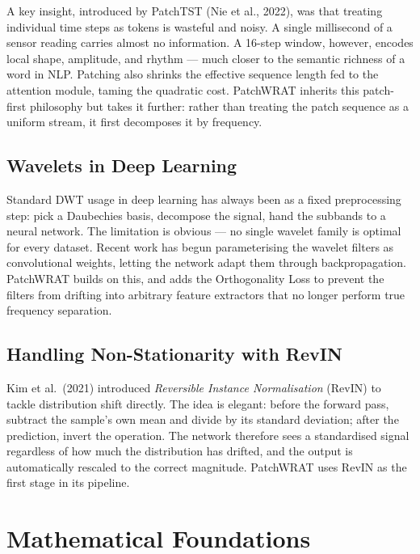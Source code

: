 \documentclass[11pt, letterpaper]{article}
\begin{document}
A key insight, introduced by PatchTST (Nie et al., 2022), was that treating individual time
steps as tokens is wasteful and noisy. A single millisecond of a sensor reading carries almost
no information. A 16-step window, however, encodes local shape, amplitude, and rhythm — much
closer to the semantic richness of a word in NLP. Patching also shrinks the effective
sequence length fed to the attention module, taming the quadratic cost. PatchWRAT inherits
this patch-first philosophy but takes it further: rather than treating the patch sequence as a
uniform stream, it first decomposes it by frequency.

\subsection{Wavelets in Deep Learning}

Standard DWT usage in deep learning has always been as a fixed preprocessing step: pick a
Daubechies basis, decompose the signal, hand the subbands to a neural network. The limitation
is obvious — no single wavelet family is optimal for every dataset. Recent work has begun
parameterising the wavelet filters as convolutional weights, letting the network adapt them
through backpropagation. PatchWRAT builds on this, and adds the Orthogonality Loss to prevent
the filters from drifting into arbitrary feature extractors that no longer perform true
frequency separation.

\subsection{Handling Non-Stationarity with RevIN}

Kim et al.\ (2021) introduced \emph{Reversible Instance Normalisation} (RevIN) to tackle
distribution shift directly. The idea is elegant: before the forward pass, subtract the
sample's own mean and divide by its standard deviation; after the prediction, invert the
operation. The network therefore sees a standardised signal regardless of how much the
distribution has drifted, and the output is automatically rescaled to the correct magnitude.
PatchWRAT uses RevIN as the first stage in its pipeline.

\section{Mathematical Foundations}
\end{document}
